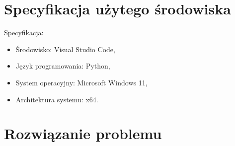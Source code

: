 \documentclass[11pt]{scrartcl}
\begin{document}
    \section{Specyfikacja użytego środowiska}
    Specyfikacja:

    \begin{itemize}
        \item Środowisko: Visual Studio Code,
        \item Język programowania: Python,
        \item System operacyjny: Microsoft Windows 11,
        \item Architektura systemu: x64.
    \end{itemize}

    \section{Rozwiązanie problemu}
    
\end{document}
